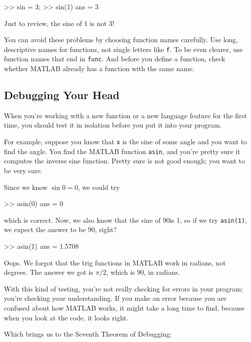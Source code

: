 \begin{code}
>> sin = 3;
>> sin(1)
ans = 3
\end{code}

Just to review, the sine of 1 is not 3!

You can avoid these problems by choosing function names carefully. Use long, descriptive names for functions, not single letters like \lstinline{f}. To be even clearer, use function names that end in \lstinline{func}. And before you define a function, check whether MATLAB already has a function with the same name.

\subsection{Debugging Your Head}

When you're working with a new function or a new language feature
for the first time, you should test it in isolation before you
put it into your program.


For example, suppose you know that \lstinline{x} is the sine of some
angle and you want to find the angle.  You find the MATLAB function
\lstinline{asin}, and you're pretty sure it computes the inverse sine
function.  Pretty sure is not good enough; you want to be very sure.

Since we know $\sin 0 = 0$, we could try

\begin{code}
>> asin(0)
ans = 0
\end{code}
which is correct.  Now, we also know that the sine of $90$\textdegree is
1, so if we try \lstinline{asin(1)}, we expect the answer to be 90, right?

\begin{code}
>> asin(1)
ans = 1.5708
\end{code}

Oops.  We forgot that the trig functions in MATLAB work in radians,
not degrees.  The answer we got is $\pi/2$, which is $90$\textdegree, in radians.

With this kind of testing, you're not really checking for
errors in your program; you're checking your understanding.  If you
make an error because you are confused about how MATLAB works, it
might take a long time to find, because when you look at the code,
it looks right.


Which brings us to the Seventh Theorem of Debugging:


